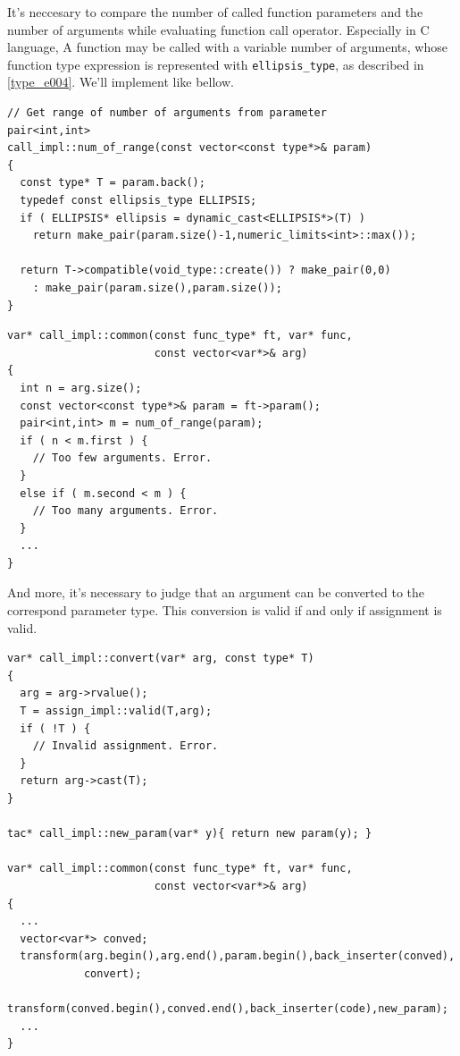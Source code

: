 It's neccesary to compare
the number of called function parameters and
the number of arguments while evaluating function call operator.
Especially in C language, 
A function may be called with a variable number of arguments,
whose function type expression is represented with {\tt{ellipsis\_type}},
as described in \ref{type_e004}. We'll implement like bellow.
\begin{verbatim}
// Get range of number of arguments from parameter
pair<int,int>
call_impl::num_of_range(const vector<const type*>& param)
{
  const type* T = param.back();
  typedef const ellipsis_type ELLIPSIS;
  if ( ELLIPSIS* ellipsis = dynamic_cast<ELLIPSIS*>(T) )
    return make_pair(param.size()-1,numeric_limits<int>::max());

  return T->compatible(void_type::create()) ? make_pair(0,0)
    : make_pair(param.size(),param.size());
}
\end{verbatim}

\begin{verbatim}
var* call_impl::common(const func_type* ft, var* func,
                       const vector<var*>& arg)
{
  int n = arg.size();
  const vector<const type*>& param = ft->param();
  pair<int,int> m = num_of_range(param);
  if ( n < m.first ) {
    // Too few arguments. Error.
  }
  else if ( m.second < m ) {
    // Too many arguments. Error.
  } 
  ...
}
\end{verbatim}

And more, it's necessary to judge that an argument
can be converted to the correspond parameter type.
This conversion is valid if and only if assignment is valid.
\begin{verbatim}
var* call_impl::convert(var* arg, const type* T)
{
  arg = arg->rvalue();
  T = assign_impl::valid(T,arg);
  if ( !T ) {
    // Invalid assignment. Error.
  }
  return arg->cast(T);
}

tac* call_impl::new_param(var* y){ return new param(y); }

var* call_impl::common(const func_type* ft, var* func,
                       const vector<var*>& arg)
{
  ...
  vector<var*> conved;
  transform(arg.begin(),arg.end(),param.begin(),back_inserter(conved),
            convert);
  transform(conved.begin(),conved.end(),back_inserter(code),new_param);
  ...
}
\end{verbatim}

